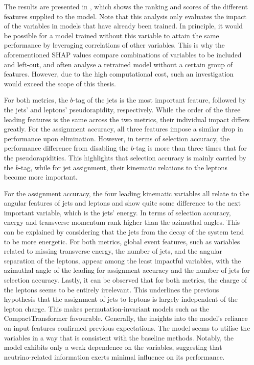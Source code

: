 The results are presented in , which shows the ranking and scores of the different features supplied to the model.
Note that this analysis only evaluates the impact of the variables in models that have already been trained. In principle, it would be possible for a model trained without this variable to attain the same performance by leveraging correlations of other variables. This is why the aforementioned SHAP values compare combinations of variables to be included and left-out, and often analyse a retrained model without a certain group of features.
However, due to the high computational cost, such an investigation would exceed the scope of this thesis.

For both metrics, the $b$-tag of the jets is the most important feature, followed by the jets' and leptons' pseudorapidity, respectively. While the order of the three leading features is the same across the two metrics, their individual impact differs greatly. For the assignment accuracy, all three features impose a similar drop in performance upon elimination. However, in terms of selection accuracy, the performance difference from disabling the $b$-tag is more than three times that for the pseudorapidities. This highlights that selection accuracy is mainly carried by the $b$-tag, while for jet assignment, their kinematic relations to the leptons become more important.

For the assignment accuracy, the four leading kinematic variables all relate to the angular features of jets and leptons and show quite some difference to the next important variable, which is the jets'
energy. In terms of selection accuracy, energy and transverse momentum rank higher than the azimuthal angles. This can be explained by considering that the jets from the decay of the \ttbar system tend to be more energetic. For both metrics, global event features, such as variables related to missing transverse energy, the number of jets, and the angular separation of the leptons, appear among the least impactful variables, with the azimuthal angle of the \met leading for assignment accuracy and the number of jets for selection accuracy. Lastly, it can be observed that for both metrics, the charge of the leptons seems to be entirely irrelevant. This underlines the previous hypothesis that the assignment of jets to leptons is largely independent of the lepton charge. This makes permutation-invariant models such as the CompactTransformer favourable.
Generally, the insights into the model's reliance on input features confirmed previous expectations. The model seems to utilise the variables in a way that is consistent with the baseline methods.
Notably, the model exhibits only a weak dependence on the \met variables, suggesting that neutrino-related information exerts minimal influence on its performance.

